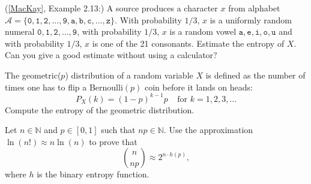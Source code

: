 \documentclass[a4paper,10pt,landscape,twocolumn]{scrartcl}
\begin{document}
\begin{exercise}
(\href{http://www.inference.phy.cam.ac.uk/mackay/itila/book.html}{[MacKay]}, Example 2.13:) A source produces a character $x$ from alphabet $\mathcal{A} = \{\mathtt{0, 1, 2, ..., 9, a, b, c, ..., z}\}$. With probability $1/3$, $x$ is a uniformly random numeral $\mathtt{0,1,2,...,9}$, with probability $1/3$, $x$ is a random vowel $\mathtt{a,e,i,o,u}$ and with probability $1/3$, $x$ is one of the 21 consonants. Estimate the entropy of $X$. Can you give a good estimate without using a calculator?
\end{exercise}

\begin{exercise}
The geometric($p$) distribution of a random variable $X$ is defined as the number of times one has to flip a Bernoulli$(p)$ coin before it lands on heads:
\[
P_X(k) = (1-p)^{k-1}p \ \ \ \ \ \mbox{for } k = 1, 2, 3, ...
\]
Compute the entropy of the geometric distribution.
\end{exercise}

\begin{exercise}
Let $n \in \mathbb{N}$ and $p \in [0,1]$ such that $np \in \mathbb{N}$. Use the approximation $\ln(n!) \approx n \ln(n)$ to prove that
\[
{n \choose np} \approx 2^{n \cdot h(p)},
\]
where $h$ is the binary entropy function.
\end{exercise}
\end{document}
